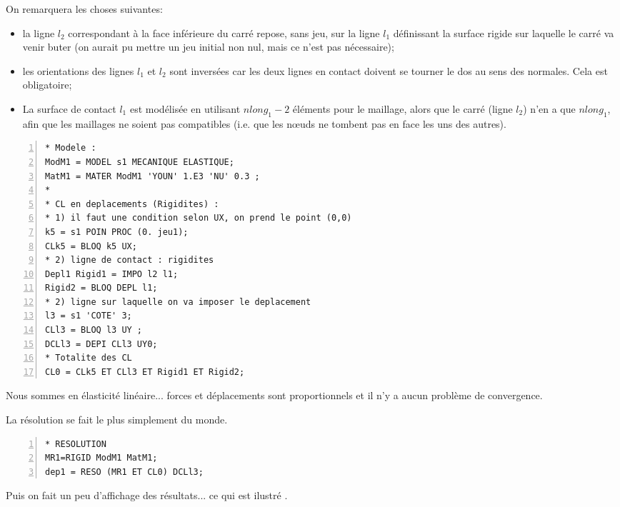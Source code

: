 \medskip
On remarquera les choses suivantes:
\begin{itemize}
   \item la ligne $l_2$ correspondant à la face inférieure du carré \og repose\fg{}, sans jeu, sur la
	ligne $l_1$ définissant la surface rigide sur laquelle le carré va venir buter (on aurait pu mettre
	un jeu initial non nul, mais ce n'est pas nécessaire);
   \item les orientations des lignes $l_1$ et $l_2$ sont inversées car les deux lignes en contact doivent se 
	\og tourner le dos\fg{} au sens des normales. Cela est obligatoire;
   \item La surface de contact $l_1$ est modélisée en utilisant $nlong_1-2$ éléments pour le maillage, 
	alors que le carré (ligne $l_2$) n'en a que $nlong_1$, afin que les maillages ne soient pas \og compatibles\fg{} 
	(i.e. que les nœuds ne tombent pas en face les uns des autres).
\end{itemize}

\color{gris}\scriptsize
\begin{multicols}{2}
\begin{Verbatim}[numbers=left,numbersep=3pt,firstnumber=last]
* Modele :
ModM1 = MODEL s1 MECANIQUE ELASTIQUE;
MatM1 = MATER ModM1 'YOUN' 1.E3 'NU' 0.3 ;
*
* CL en deplacements (Rigidites) :
* 1) il faut une condition selon UX, on prend le point (0,0)
k5 = s1 POIN PROC (0. jeu1);
CLk5 = BLOQ k5 UX;
* 2) ligne de contact : rigidites
Depl1 Rigid1 = IMPO l2 l1;
Rigid2 = BLOQ DEPL l1;
* 2) ligne sur laquelle on va imposer le deplacement
l3 = s1 'COTE' 3;
CLl3 = BLOQ l3 UY ;
DCLl3 = DEPI CLl3 UY0;
* Totalite des CL
CL0 = CLk5 ET CLl3 ET Rigid1 ET Rigid2;
\end{Verbatim}
\end{multicols}
\color{black}\normalsize

\medskip
Nous sommes en élasticité linéaire... forces et déplacements sont proportionnels et il n'y a aucun problème 
de convergence.

La résolution se fait le plus simplement du monde.

\color{gris}\scriptsize
\begin{Verbatim}[numbers=left,numbersep=3pt,firstnumber=last]
* RESOLUTION
MR1=RIGID ModM1 MatM1;
dep1 = RESO (MR1 ET CL0) DCLl3;
\end{Verbatim}
\color{black}\normalsize

\medskip
Puis on fait un peu d'affichage des résultats... ce qui est ilustré .

